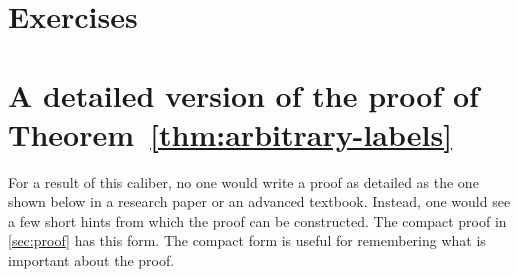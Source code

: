 \documentclass[11pt,twoside]{article}
\theoremstyle{definition}
\theoremstyle{remark}
\renewcommand{\thesection}{2.\arabic{section}}
\begin{document}
\section{Exercises}
\label{sec:exercises}
\exerciseinstructions
\setcounter{courseexercise}{0}






























\clearpage
\appendix
\renewcommand{\thesection}{\Alph{section}}

\section{A detailed version of the proof of Theorem~\ref{thm:arbitrary-labels}}
\label{app:detailed-proof}

For a result of this caliber, no one would write a proof as detailed as the one
shown below in a research paper or an advanced textbook. Instead, one would
see a few short hints from which the proof can be constructed. The compact
proof in \cref{sec:proof} has this form. The compact form is useful for remembering
what is important about the proof.
\end{document}
